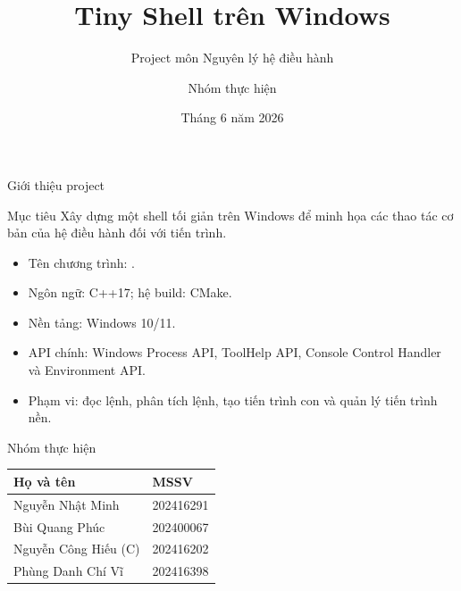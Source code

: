 \documentclass[aspectratio=169,10pt]{beamer}
\title[Tiny Shell]{Tiny Shell trên Windows}
\subtitle{Project môn Nguyên lý hệ điều hành}
\author{Nhóm thực hiện}
\institute{IT3070}
\date{Tháng 6 năm 2026}
\newcommand{\code}[1]{\texttt{\detokenize{#1}}}
\begin{document}
\begin{frame}{Giới thiệu project}
  \begin{block}{Mục tiêu}
    Xây dựng một shell tối giản trên Windows để minh họa các thao tác cơ bản của hệ điều hành đối với tiến trình.
  \end{block}

  \begin{itemize}
    \item Tên chương trình: \code{myShell}.
    \item Ngôn ngữ: C++17; hệ build: CMake.
    \item Nền tảng: Windows 10/11.
    \item API chính: Windows Process API, ToolHelp API, Console Control Handler và Environment API.
    \item Phạm vi: đọc lệnh, phân tích lệnh, tạo tiến trình con và quản lý tiến trình nền.
  \end{itemize}
\end{frame}

\begin{frame}{Nhóm thực hiện}
  \begin{table}
    \large
    \begin{tabular}{@{}ll@{}}
      \toprule
      Họ và tên & MSSV \\
      \midrule
      Nguyễn Nhật Minh & 202416291 \\
      Bùi Quang Phúc & 202400067 \\
      Nguyễn Công Hiếu {\color{blue}(C)} & 202416202 \\
      Phùng Danh Chí Vĩ & 202416398 \\
      \bottomrule
    \end{tabular}
  \end{table}
\end{frame}
\end{document}
